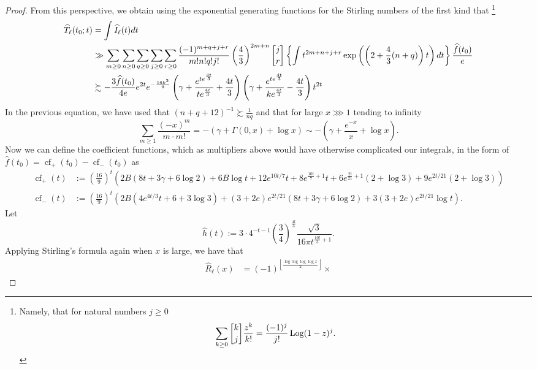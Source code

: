 \documentclass[11pt,reqno,a4letter]{article}
\numberwithin{figure}{section}
\numberwithin{table}{section}
\newcommand{\gkpSI}[2]{\ensuremath{\genfrac{\lbrack}{\rbrack}{0pt}{}{#1}{#2}}}
\newcommand{\Floor}[2]{\ensuremath{\left\lfloor \frac{#1}{#2} \right\rfloor}}
\theoremstyle{plain}
\numberwithin{theorem}{section}
\theoremstyle{definition}
\begin{document}
\begin{proof}
From this perspective, we obtain using the exponential generating functions for the 
Stirling numbers of the first kind that \cite[\S 7.4]{GKP}\footnote{ 
     Namely, that for natural numbers $j \geq 0$ 
     \[
     \sum_{k \geq 0} \gkpSI{k}{j} \frac{z^k}{k!} = \frac{(-1)^j}{j!} \operatorname{Log}(1-z)^j. 
     \]
} 
\begin{align*}
\widehat{T}_{\ell}(t_0; t) & = \int \widehat{I}_{\ell}(t) dt \\ 
     & \gg \sum_{m \geq 0} \sum_{n \geq 0} \sum_{q \geq 0} \sum_{j \geq 0} \sum_{r \geq 0} 
     \frac{(-1)^{m+q+j+r}}{m! n! q! j!} \left(\frac{4}{3}\right)^{2m+n} \gkpSI{j}{r} 
     \left\{\int 
     t^{2m+n+j+r} \exp\left(\left(2 + \frac{4}{3}(n+q)\right) t\right) dt 
     \right\} \frac{\widehat{f}(t_0)}{e} \\ 
     & \succsim 
     -\frac{3 \widehat{f}(t_0)}{4e} e^{2t} e^{-\frac{16 k^2}{9}} \left( 
     \gamma + \frac{e^{te^{\frac{4t}{3}}}}{t e^{\frac{4t}{3}}} + \frac{4t}{3}
     \right) \left(
     \gamma + \frac{e^{te^{\frac{4t}{3}}}}{k e^{\frac{4t}{3}}} - \frac{4t}{3} 
     \right) t^{2t} 
\end{align*} 
In the previous equation, we have used that $(n+q+12)^{-1} \succsim \frac{1}{nq}$ and that 
for large $x \ggg 1$ tending to infinity 
\[
\sum_{m \geq 1} \frac{(-x)^m}{m \cdot m!} = -\left(\gamma + \Gamma(0, x) + \log x\right) \sim 
     -\left(\gamma + \frac{e^{-x}}{x} + \log x\right). 
\]
Now we can define the coefficient functions, which as multipliers above 
would have otherwise complicated our integrals, 
in the form of $\widehat{f}(t_0) = \operatorname{cf}_{+}(t_0) - \operatorname{cf}_{-}(t_0)$ as 
\begin{align*}
\operatorname{cf}_{+}(t) & := \left(\frac{16}{9}\right)^t \left(2 B (8 t+3 \gamma +
     6 \log 2)+6 B \log t+12 e^{10 t/7} t+8 e^{\frac{10 t}{7}+1} t+6 e^{\frac{2 t}{21}+1}
     (2+\log 3)+9 e^{2 t/21} (2+\log 3)\right)\\ 
\operatorname{cf}_{-}(t) & := \left(\frac{16}{9}\right)^t \left(2 B \left(4 e^{4 t/3} t+6+3 
     \log 3\right)+(3+2 e) e^{2 t/21} (8 t+3 \gamma +6 \log 2)+3 (3+2 e) e^{2 t/21}
     \log t\right). 
\end{align*} 
Let 
\[
\widehat{h}(t) := 3 \cdot 4^{-t-1} \left(\frac{3}{4}\right)^{\frac{4t}{3}} \frac{\sqrt{3}}{ 
     16\pi t^{\frac{10t}{3}+1}}. 
\]
Applying Stirling's formula again when $x$ is large, we have that 
\begin{align} 
\label{proof_thm_GInvFunc_v2}  
\widehat{R}_{\ell}(x) & = (-1)^{\Floor{\log\log\log\log x}{2}} \times 

\end{align}
\end{proof}
\end{document}
